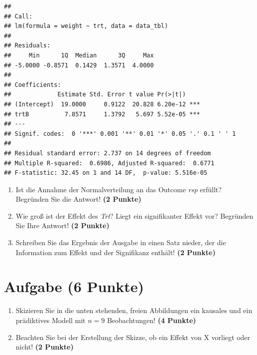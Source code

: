 \documentclass[a4paper, 10pt]{scrartcl}\usepackage[]{graphicx}\usepackage[]{xcolor}
\makeatletter
\newenvironment{kframe}{%
 \def\at@end@of@kframe{}%
 \ifinner\ifhmode%
  \def\at@end@of@kframe{\end{minipage}}%
  \begin{minipage}{\columnwidth}%
 \fi\fi%
 \def\FrameCommand##1{\hskip\@totalleftmargin \hskip-\fboxsep
 \colorbox{shadecolor}{##1}\hskip-\fboxsep
     \hskip-\linewidth \hskip-\@totalleftmargin \hskip\columnwidth}%
 \MakeFramed {\advance\hsize-\width
   \@totalleftmargin\z@ \linewidth\hsize
   \@setminipage}}%
 {\par\unskip\endMakeFramed%
 \at@end@of@kframe}
\newenvironment{knitrout}{}{} %
\makeatother
\begin{document}
\begin{knitrout}
\color{fgcolor}\begin{kframe}
\begin{verbatim}
## 
## Call:
## lm(formula = weight ~ trt, data = data_tbl)
## 
## Residuals:
##     Min      1Q  Median      3Q     Max 
## -5.0000 -0.8571  0.1429  1.3571  4.0000 
## 
## Coefficients:
##             Estimate Std. Error t value Pr(>|t|)    
## (Intercept)  19.0000     0.9122  20.828 6.20e-12 ***
## trtB          7.8571     1.3792   5.697 5.52e-05 ***
## ---
## Signif. codes:  0 '***' 0.001 '**' 0.01 '*' 0.05 '.' 0.1 ' ' 1
## 
## Residual standard error: 2.737 on 14 degrees of freedom
## Multiple R-squared:  0.6986,	Adjusted R-squared:  0.6771 
## F-statistic: 32.45 on 1 and 14 DF,  p-value: 5.516e-05
\end{verbatim}
\end{kframe}
\end{knitrout}


\begin{enumerate}
\item Ist die Annahme der Normalverteilung an das Outcome \textit{rsp} erf{\"u}llt?
  Begr{\"u}nden Sie die Antwort! \textbf{(2 Punkte)}
\item Wie gro{\ss} ist der Effekt des \textit{Trt}? Liegt ein signifikanter
  Effekt vor? Begr{\"u}nden Sie Ihre Antwort! \textbf{(2 Punkte)}
\item Schreiben Sie das Ergebnis der \Rlogo Ausgabe in einen Satz nieder, der die
  Information zum Effekt und der Signifikanz enth{\"a}lt! \textbf{(2 Punkte)} 
\end{enumerate}
 
\clearpage

\section{Aufgabe \hfill (6 Punkte)}



\begin{enumerate}
\item Skizieren Sie in die unten stehenden, freien Abbildungen ein kausales
  und ein pr{\"a}diktives Modell mit $n = 9$
  Beobachtungen! \textbf{(4 Punkte)}
\item Beachten Sie bei der Erstellung der Skizze, ob ein Effekt von X
  vorliegt oder nicht! \textbf{(2 Punkte)}
\end{enumerate}
\end{document}
